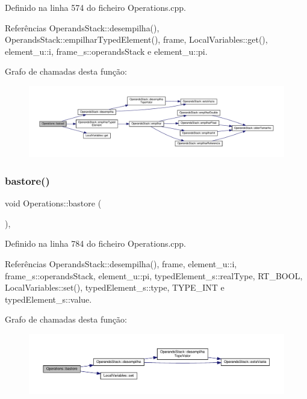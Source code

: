 Definido na linha 574 do ficheiro Operations.\+cpp.



Referências Operands\+Stack\+::desempilha(), Operands\+Stack\+::empilhar\+Typed\+Element(), frame, Local\+Variables\+::get(), element\+\_\+u\+::i, frame\+\_\+s\+::operands\+Stack e element\+\_\+u\+::pi.

Grafo de chamadas desta função\+:\nopagebreak
\begin{figure}[H]
\begin{center}
\leavevmode
\includegraphics[width=350pt]{classOperations_afdf1759637e332569a2b2b17067e05f0_cgraph}
\end{center}
\end{figure}
\mbox{\label{classOperations_a6f0ded6d2fc9921a1418387527bec8f4}} 
\subsubsection{\texorpdfstring{bastore()}{bastore()}}
{\footnotesize\ttfamily void Operations\+::bastore (\begin{DoxyParamCaption}{ }\end{DoxyParamCaption})\hspace{0.3cm}{\ttfamily [static]}, {\ttfamily [private]}}



Definido na linha 784 do ficheiro Operations.\+cpp.



Referências Operands\+Stack\+::desempilha(), frame, element\+\_\+u\+::i, frame\+\_\+s\+::operands\+Stack, element\+\_\+u\+::pi, typed\+Element\+\_\+s\+::real\+Type, R\+T\+\_\+\+B\+O\+OL, Local\+Variables\+::set(), typed\+Element\+\_\+s\+::type, T\+Y\+P\+E\+\_\+\+I\+NT e typed\+Element\+\_\+s\+::value.

Grafo de chamadas desta função\+:\nopagebreak
\begin{figure}[H]
\begin{center}
\leavevmode
\includegraphics[width=350pt]{classOperations_a6f0ded6d2fc9921a1418387527bec8f4_cgraph}
\end{center}
\end{figure}
\mbox{\label{classOperations_a981b0f43cbe76b4fe7e2122c482d4a5b}} 
